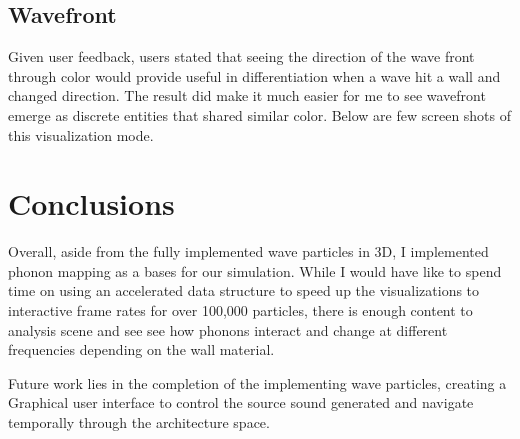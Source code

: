 \documentclass{thesis}
\begin{document}


\section{ Wavefront}
Given user feedback, users stated that seeing the direction of the wave front through color would provide useful in differentiation when a wave hit a wall and changed direction. The result did make it much easier for me to see wavefront emerge as discrete entities that shared similar color. Below are few screen shots of this visualization mode.



\chapter{Conclusions}

Overall, aside from the fully implemented wave particles in 3D, I implemented
phonon mapping as a bases for our simulation. While I would have like to spend time on using an accelerated data structure to speed up the visualizations to interactive frame rates for over 100,000 particles, there is enough content to analysis scene and see see how phonons interact and change at different frequencies depending on the wall material.

Future work lies in the completion of the implementing wave particles, creating a Graphical user interface to control the source sound generated and 
navigate temporally through the architecture space.

\begin{singlespace}
{}

\end{singlespace}
\end{document}
